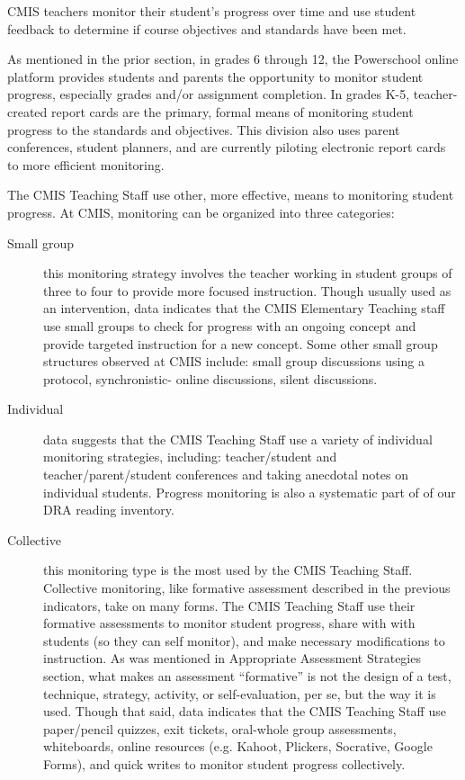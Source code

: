 
\begin{findings}
CMIS teachers monitor their student’s progress over time and use student feedback to determine if course objectives and standards have been met. 

As mentioned in the prior section, in grades 6 through 12, the Powerschool online platform provides students and parents the opportunity to monitor student progress, especially grades and/or assignment completion. In grades K-5, teacher-created report cards are the primary, formal means of monitoring student progress to the standards and objectives. This division also uses parent conferences, student planners, and are currently piloting electronic report cards to more efficient monitoring. 

The CMIS Teaching Staff use other, more effective, means to monitoring student progress. At CMIS, monitoring can be organized into three categories:

\begin{description}
\item [Small group] this monitoring strategy involves the teacher working in student groups of three to four to provide more focused instruction. Though usually used  as an intervention, data indicates that the CMIS Elementary Teaching staff use small groups to check for progress with an ongoing concept and provide targeted instruction for a new concept. Some other small group structures observed at CMIS include: small group discussions using a protocol, synchronistic- online discussions, silent discussions. 
\item [Individual] data suggests that the CMIS Teaching Staff use a variety of individual monitoring strategies, including: teacher/student and teacher/parent/student  conferences and taking anecdotal notes on individual students. Progress monitoring is also a systematic part of of our DRA reading inventory. 
\item [Collective] this monitoring type is the most used by the CMIS Teaching Staff. Collective monitoring, like formative assessment described in the previous indicators, take on many forms. The CMIS Teaching Staff use their formative assessments to monitor student progress, share with with students (so they can self monitor), and make necessary modifications to instruction. As was mentioned in Appropriate Assessment Strategies section, what makes an assessment “formative” is not the design of a test, technique, strategy, activity, or self-evaluation, per se, but the way it is used. Though that said, data indicates that the CMIS Teaching Staff use paper/pencil quizzes, exit tickets, oral-whole group assessments, whiteboards, online resources (e.g. Kahoot, Plickers, Socrative, Google Forms), and quick writes to monitor student progress collectively.
\end{description}
 

\end{findings}
